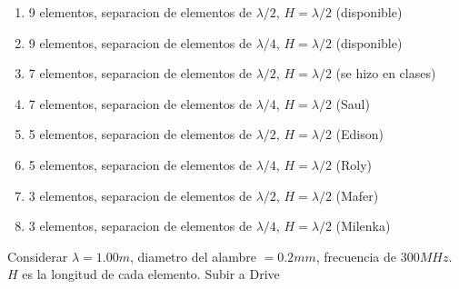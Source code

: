 \documentclass[11pt]{book}
\begin{document}
\begin{enumerate}
	\item 9 elementos, separacion de elementos de $\lambda/2$, $H=\lambda/2$ (disponible)
	\item 9 elementos, separacion de elementos de $\lambda/4$, $H=\lambda/2$ (disponible) 
	\item 7 elementos, separacion de elementos de $\lambda/2$, $H=\lambda/2$ (se hizo en clases) 
	\item 7 elementos, separacion de elementos de $\lambda/4$, $H=\lambda/2$ (Saul) 
	\item 5 elementos, separacion de elementos de $\lambda/2$, $H=\lambda/2$ (Edison) 
	\item 5 elementos, separacion de elementos de $\lambda/4$, $H=\lambda/2$ (Roly) 
	\item 3 elementos, separacion de elementos de $\lambda/2$, $H=\lambda/2$ (Mafer) 
	\item 3 elementos, separacion de elementos de $\lambda/4$, $H=\lambda/2$ (Milenka) 
\end{enumerate}

Considerar $\lambda=1.00m$, diametro del alambre $=0.2mm$, frecuencia de $300MHz$. $H$ es la longitud de cada elemento. Subir a Drive
	
\end{document}

